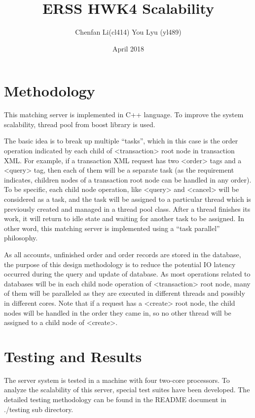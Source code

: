 \documentclass{article}
\title{ERSS HWK4 Scalability}
\author{Chenfan Li(cl414) You Lyu (yl489)}
\date{April 2018}
\begin{document}
\maketitle

\section{Methodology}
This matching server is implemented in C++ language. To improve the system scalability, thread pool from boost library is used.\vspace{\baselineskip}

The basic idea is to break up multiple “tasks”, which in this case is the order operation indicated by each child of <transaction> root node in transaction XML. For example, if a transaction XML request has two <order> tags and a <query> tag, then each of them will be a separate task (as the requirement indicates, children nodes of a transaction root node can be handled in any order). To be specific, each child node operation, like <query> and <cancel> will be considered as a task, and the task will be assigned to a particular thread which is previously created and managed in a thread pool class. After a thread finishes its work, it will return to idle state and waiting for another task to be assigned. In other word, this matching server is implemented using a “task parallel” philosophy.\vspace{\baselineskip}

As all accounts, unfinished order and order records are stored in the database, the purpose of this design methodology is to reduce the potential IO latency occurred during the query and update of database. As most operations related to databases will be in each child node operation of <transaction> root node, many of them will be paralleled as they are executed in different threads and possibly in different cores.
Note that if a request has a <create> root node, the child nodes will be handled in the order they came in, so no other thread will be assigned to a child node of <create>.

\section{Testing and Results}
The server system is tested in a machine with four two-core processors. To analyze the scalability of this server, special test suites have been developed. The detailed testing methodology can be found in the README document in ./testing sub directory.
\end{document}
